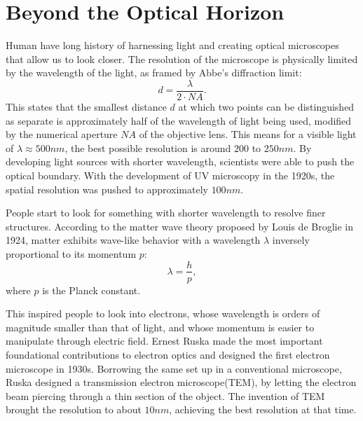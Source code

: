 \section{Beyond the Optical Horizon}
Human have long history of harnessing light and creating optical microscopes that allow us to look closer. The resolution of the microscope is physically limited by the wavelength of the light, as framed by Abbe's diffraction limit:
\begin{equation}
	d = \frac{\lambda}{2\cdot NA}.
\end{equation}
This states that the smallest distance $d$ at which two points can be distinguished as separate is approximately half of the wavelength of light being used, modified by the numerical aperture $NA$ of the objective lens. This means for a visible light of $\lambda \approx 500nm$, the best possible resolution is around $200$ to $250nm$. By developing light sources with shorter wavelength, scientists were able to push the optical boundary. With the development of UV microscopy in the 1920s, the spatial resolution was pushed to approximately $100nm$. 

People start to look for something with shorter wavelength to resolve finer structures. According to the matter wave theory proposed by Louis de Broglie in 1924, matter exhibits wave-like behavior with a wavelength $\lambda$ inversely proportional to its momentum $p$: 
\begin{equation}
	\lambda = \frac{h}{p},
\end{equation}
where $p$ is the Planck constant. 

This inspired people to look into electrons, whose wavelength is orders of magnitude smaller than that of light, and whose momentum is easier to manipulate through electric field. Ernest Ruska made the most important foundational contributions to electron optics and designed the first electron microscope in 1930s. Borrowing the same set up in a conventional microscope, Ruska designed a transmission electron microscope(TEM), by letting the electron beam piercing through a thin section of the object. The invention of TEM brought the resolution to about $10nm$, achieving the best resolution at that time. 

